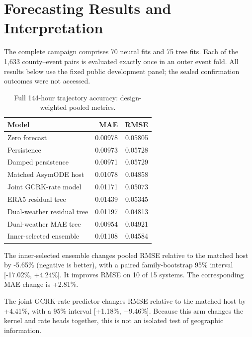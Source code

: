 \section{Forecasting Results and Interpretation}

The complete campaign comprises 70 neural fits and 75 tree fits. Each of the 1,633 county--event pairs is evaluated exactly once in an outer event fold. All results below use the fixed public development panel; the sealed confirmation outcomes were not accessed.

\begin{table}[ht]\centering\small

\caption{Full 144-hour trajectory accuracy: design-weighted pooled metrics.}

\begin{tabular}{lrr}\toprule Model & MAE & RMSE \\\midrule

Zero forecast & 0.00978 & 0.05805 \\

Persistence & 0.00973 & 0.05728 \\

Damped persistence & 0.00971 & 0.05729 \\

Matched AsymODE host & 0.01078 & 0.04858 \\

Joint GCRK-rate model & 0.01171 & 0.05073 \\

ERA5 residual tree & 0.01439 & 0.05345 \\

Dual-weather residual tree & 0.01197 & 0.04813 \\

Dual-weather MAE tree & 0.00954 & 0.04921 \\

Inner-selected ensemble & 0.01108 & 0.04584 \\

\bottomrule\end{tabular}\end{table}

The inner-selected ensemble changes pooled RMSE relative to the matched host by -5.65\% (negative is better), with a paired family-bootstrap 95\% interval [-17.02\%, +4.24\%]. It improves RMSE on 10 of 15 systems. The corresponding MAE change is +2.81\%.

The joint GCRK-rate predictor changes RMSE relative to the matched host by +4.41\%, with a 95\% interval [+1.18\%, +9.46\%]. Because this arm changes the kernel and rate heads together, this is not an isolated test of geographic information.

